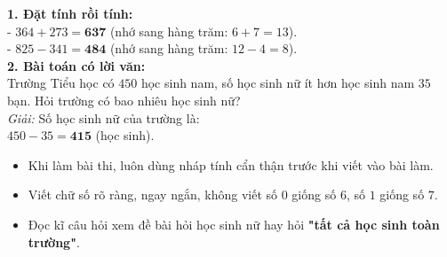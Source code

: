 \documentclass[10pt,a4paper]{article}
\begin{document}
\vspace{-1.5mm}
\noindent
\begin{minipage}[t]{0.49\textwidth}\vspace{0pt}
\begin{tcolorbox}[
  enhanced,
  colback=green!4!white,
  colframe=green!60!black,
  arc=2mm, boxrule=0.8pt,
  left=2mm, right=2mm, top=1.8mm, bottom=1.8mm,
  title={\footnotesize\bfseries\color{white}\faCheckCircle\ 4. Bài tập thực hành mẫu}
]
{\footnotesize
\textbf{1. Đặt tính rồi tính:}\\
- $364 + 273 = \mathbf{637}$ (nhớ sang hàng trăm: $6+7=13$).\\
- $825 - 341 = \mathbf{484}$ (nhớ sang hàng trăm: $12-4=8$).\\
\textbf{2. Bài toán có lời văn:}\\
Trường Tiểu học có $450$ học sinh nam, số học sinh nữ ít hơn học sinh nam $35$ bạn. Hỏi trường có bao nhiêu học sinh nữ?\\
\textit{Giải:} Số học sinh nữ của trường là:\\
$450 - 35 = \mathbf{415}$ (học sinh).
}
\end{tcolorbox}
\end{minipage}
\hfill
\begin{minipage}[t]{0.49\textwidth}\vspace{0pt}
\begin{tcolorbox}[
  enhanced,
  colback=rose!4!white,
  colframe=rose!70!black,
  arc=2mm, boxrule=0.8pt,
  left=2mm, right=2mm, top=1.8mm, bottom=1.8mm,
  title={\footnotesize\bfseries\color{white}\faExclamationTriangle\ 5. Lời dặn dò thi học kì}
]
{\footnotesize
\begin{itemize}\setlength{\itemsep}{1.5pt}\setlength{\leftskip}{-2.5mm}
  \item Khi làm bài thi, luôn dùng nháp tính cẩn thận trước khi viết vào bài làm.
  \item Viết chữ số rõ ràng, ngay ngắn, không viết số $0$ giống số $6$, số $1$ giống số $7$.
  \item Đọc kĩ câu hỏi xem đề bài hỏi học sinh nữ hay hỏi \textbf{"tất cả học sinh toàn trường"}.
\end{itemize}
}
\end{tcolorbox}
\end{minipage}
\end{document}
